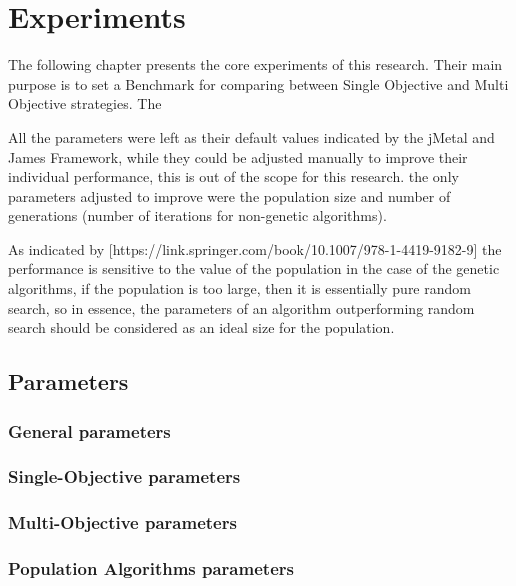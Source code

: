 \chapter{Experiments}
\label{chapter:chapter05}

The following chapter presents the core experiments of this research. Their main purpose is to set a Benchmark for comparing between Single Objective and Multi Objective strategies. The 



All the parameters were left as their default values indicated by the jMetal and James Framework, while they could be adjusted manually to improve their individual performance, this is out of the scope for this research. the only parameters adjusted to improve were the population size and number of generations (number of iterations for non-genetic algorithms).

As indicated by [https://link.springer.com/book/10.1007/978-1-4419-9182-9] the performance is sensitive to the value of the population in the case of the genetic algorithms, if the population is too large, then it is essentially pure random search, so in essence, the parameters of an algorithm outperforming random search should be considered as an ideal size for the population.

\section{Parameters}

\subsection{General parameters}


\subsection{Single-Objective parameters}



\subsection{Multi-Objective parameters}



\subsection{Population Algorithms parameters}



